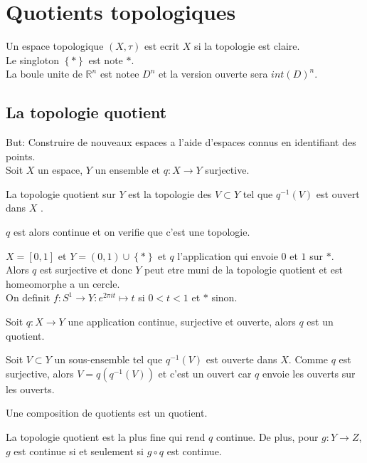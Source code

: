 \documentclass[../main.tex]{subfiles}
\begin{document}
\section{Quotients topologiques}
Un espace topologique $( X,\tau) $ est ecrit $X$ si la topologie est claire.\\
Le singloton $ \left\{ \ast \right\} $ est note $\ast$.\\
La boule unite de $ \mathbb{R}^n$ 	est notee $D^{n}$ et la version ouverte sera $int( D) ^{n}$.\\
\subsection{La topologie quotient}
But: Construire de nouveaux espaces a l'aide d'espaces connus en identifiant des points.\\
Soit $X$ un espace, $Y$ un ensemble et $q:X\to Y$ surjective.
\begin{defn}
	La topologie quotient sur $Y$ est la topologie des $V \subset Y$ tel que $q^{-1}( V) $ est ouvert dans $X$ .
\end{defn}
\begin{rmq}
$q$ est alors continue et on verifie que c'est une topologie.
\end{rmq}
\begin{exemple}
$X= [ 0,1] $ et $Y= ( 0,1) \cup \left\{ \ast \right\} $ et $q$ l'application qui envoie $0$ et $1$ sur $\ast$.\\
Alors $q$ est surjective et donc $Y$ peut etre muni de la topologie quotient et est homeomorphe a un cercle.\\
On definit $f: S^{1}\to Y: e^{2\pi i t} \mapsto t $ si $0<t<1$ et $\ast$ sinon.
\end{exemple}
\begin{propo}
Soit $q:X\to Y$ une application continue, surjective et ouverte, alors $q$ est un quotient.
\end{propo}
\begin{propo}
Soit $V \subset Y$ un sous-ensemble tel que $q^{-1}( V) $ est ouverte dans $X$. Comme $q$ est surjective, alors $V = q( q^{-1}( V) ) $ et c'est un ouvert car $q$ envoie les ouverts sur les ouverts.	
\end{propo}
\begin{propo}
Une composition de quotients est un quotient.
\end{propo}
\begin{thm}
La topologie quotient est la plus fine qui rend $q$ continue. De plus, pour $g: Y \to Z$, $g$ est continue si et seulement si $g\circ q$ est continue.
\end{thm}
\end{document}

